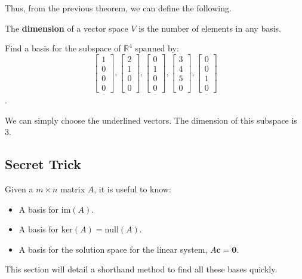 \documentclass[../main.tex]{subfiles}
\begin{document}
Thus, from the previous theorem, we can define the following.

\begin{definition}[Dimension]
    The \textbf{dimension} of a vector space \( V \) is the number of elements in any basis.
\end{definition}

\begin{example}[]
    Find a basis for the subspace of \( \mathbb{R}^4 \) spanned by:
    \[
        \underline{\begin{bmatrix} 1 \\ 0 \\ 0 \\ 0 \end{bmatrix}},
        \begin{bmatrix} 2 \\ 1 \\ 0 \\ 0 \end{bmatrix},
        \underline{\begin{bmatrix} 0 \\ 1 \\ 0 \\ 0 \end{bmatrix}},
        \begin{bmatrix} 3 \\ 4 \\ 5 \\ 0 \end{bmatrix},
        \underline{\begin{bmatrix} 0 \\ 0 \\ 1 \\ 0 \end{bmatrix}}
    \].

    We can simply choose the underlined vectors. The dimension of this subspace is 3.
\end{example}

\subsection{Secret Trick}

Given a \( m \times n \) matrix \( A \),
it is useful to know:
\begin{itemize}
    \item A basis for \( \text{im}(A) \).
    \item A basis for \( \text{ker}(A) = \text{null}(A) \).
    \item A basis for the solution space for the linear system, \( A \textbf{c} = \textbf{0} \).
\end{itemize}
This section will detail a shorthand method to find all these bases quickly.
\end{document}
